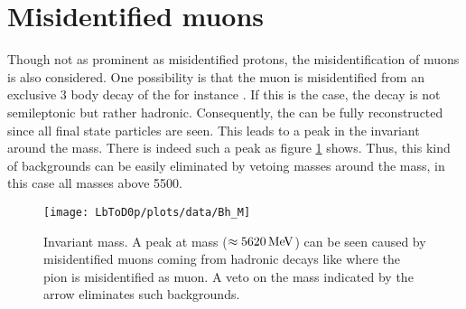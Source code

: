 \section{Misidentified muons}
\label{sec:BKG_misIDmu}
Though not as prominent as misidentified protons, the misidentification of muons is also considered.
One possibility is that the muon is misidentified from an exclusive 3 body decay of the \Lb for instance \decay{\Lb}{\Dz\proton\pim}.
If this is the case, the decay is not semileptonic but rather hadronic.
Consequently, the \Lb can be fully reconstructed since all final state particles are seen.
This leads to a peak in the invariant \Dz\proton\mun around the \Lb mass.
There is indeed such a peak as figure \ref{fig:plot_D0pmuMass} shows.
Thus, this kind of backgrounds can be easily eliminated by vetoing \Dz\proton\muon masses around the \Lb mass, in this case all masses above 5500\mev.
\begin{figure}[ptb]
	\centering
	\texttt{[image: LbToD0p/plots/data/Bh\_M]}
	\caption{Invariant \Dz\proton\mun mass. A peak at \Lb mass ($\approx 5620 \mathrm{\,Me\kern -0.1em V}$) can be seen caused by misidentified muons coming from hadronic decays like \decay{\Lb}{\Dz\proton\pi} where the pion is misidentified as muon. 
             A veto on the \Dz\proton\mun mass indicated by the arrow eliminates such backgrounds.}
	\label{fig:plot_D0pmuMass}
\end{figure}

